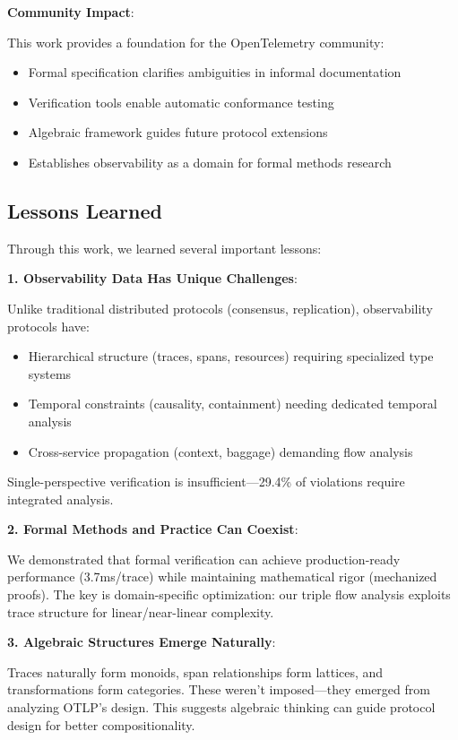\textbf{Community Impact}:

This work provides a foundation for the OpenTelemetry community:
\begin{itemize}
\item Formal specification clarifies ambiguities in informal documentation
\item Verification tools enable automatic conformance testing
\item Algebraic framework guides future protocol extensions
\item Establishes observability as a domain for formal methods research
\end{itemize}

\subsection{Lessons Learned}
\label{sec:lessons}

Through this work, we learned several important lessons:

\textbf{1. Observability Data Has Unique Challenges}:

Unlike traditional distributed protocols (consensus, replication), observability protocols have:
\begin{itemize}
\item Hierarchical structure (traces, spans, resources) requiring specialized type systems
\item Temporal constraints (causality, containment) needing dedicated temporal analysis
\item Cross-service propagation (context, baggage) demanding flow analysis
\end{itemize}

Single-perspective verification is insufficient—29.4\% of violations require integrated analysis.

\textbf{2. Formal Methods and Practice Can Coexist}:

We demonstrated that formal verification can achieve production-ready performance (3.7ms/trace) while maintaining mathematical rigor (mechanized proofs). The key is domain-specific optimization: our triple flow analysis exploits trace structure for linear/near-linear complexity.

\textbf{3. Algebraic Structures Emerge Naturally}:

Traces naturally form monoids, span relationships form lattices, and transformations form categories. These weren't imposed—they emerged from analyzing OTLP's design. This suggests algebraic thinking can guide protocol design for better compositionality.

